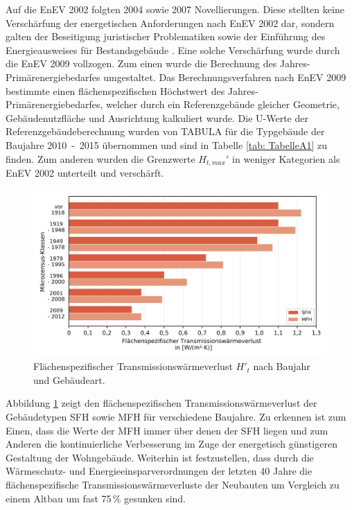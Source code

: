 Auf die EnEV 2002 folgten 2004 sowie 2007 Novellierungen.
Diese stellten keine Verschärfung der energetischen Anforderungen nach EnEV 2002 dar, sondern galten der Beseitigung juristischer Problematiken sowie der Einführung des Energieausweises für Bestandsgebäude \cite{Wild.2015}.
Eine solche Verschärfung wurde durch die EnEV 2009 vollzogen.
Zum einen wurde die Berechnung des Jahres-Primärenergiebedarfes umgestaltet.
Das Berechnungsverfahren nach EnEV 2009 bestimmte einen flächenspezifischen Höchstwert des Jahres-Primärenergiebedarfes, welcher durch ein Referenzgebäude gleicher Geometrie, Gebäudenutzfläche und Ausrichtung kalkuliert wurde.
Die U-Werte der Referenzgebäudeberechnung wurden von TABULA für die Typgebäude der Baujahre \mbox{2010 - 2015} übernommen und sind in Tabelle \ref{tab: TabelleA1} zu finden.
Zum anderen wurden die Grenzwerte \(H_{t, max}'\) in weniger Kategorien als EnEV 2002 unterteilt und verschärft.

\begin{figure}[H]
	\centering
		\includegraphics{Pictures/TransmissionswaermekoeffizientBaujahr.jpg}
	\caption{Flächenspezifischer Transmissionswärmeverlust \(H'_t\) nach Baujahr und Gebäudeart. \cite{Bigalke.2016}}
	\label{fig: Abbildung221} 
\end{figure}

Abbildung \ref{fig: Abbildung221} zeigt den flächenspezifischen Transmissionswärmeverlust der Gebäudetypen SFH sowie MFH für verschiedene Baujahre. 
Zu erkennen ist zum Einen, dass die Werte der MFH immer über denen der SFH liegen und zum Anderen die kontinuierliche Verbesserung im Zuge der energetisch günstigeren Gestaltung der Wohngebäude.
Weiterhin ist festzustellen, dass durch die Wärmeschutz- und Energieeinsparverordnungen der letzten 40 Jahre die flächenspezifische Transmissionswärmeverluste der Neubauten um Vergleich zu einem Altbau um fast 75\,\% gesunken sind.

